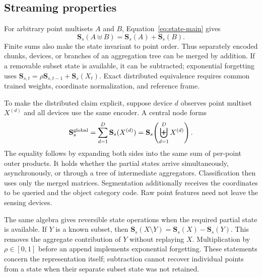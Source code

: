 \documentclass[times,twocolumn,final,authoryear]{elsarticle}
\newcommand{\Sstate}{\mathbf{S}}
\begin{document}
\subsection{Streaming properties}
For arbitrary point multisets $A$ and $B$, Equation~\eqref{eq:state-main} gives
\begin{equation}
\Sstate_s(A\uplus B)=\Sstate_s(A)+\Sstate_s(B).
\label{eq:add-main}
\end{equation}
Finite sums also make the state invariant to point order. Thus separately encoded chunks, devices, or branches of an aggregation tree can be merged by addition. If a removable subset state is available, it can be subtracted; exponential forgetting uses $\Sstate_{s,t}=\rho\Sstate_{s,t-1}+\Sstate_s(X_t)$. Exact distributed equivalence requires common trained weights, coordinate normalization, and reference frame.

To make the distributed claim explicit, suppose device $d$ observes point multiset $X^{(d)}$ and all devices use the same encoder. A central node forms
\begin{equation}
\Sstate_s^{\rm global}=\sum_{d=1}^{D}\Sstate_s(X^{(d)})
=\Sstate_s\!\left(\biguplus_{d=1}^{D}X^{(d)}\right).
\label{eq:distributed-main}
\end{equation}
The equality follows by expanding both sides into the same sum of per-point outer products. It holds whether the partial states arrive simultaneously, asynchronously, or through a tree of intermediate aggregators. Classification then uses only the merged matrices. Segmentation additionally receives the coordinates to be queried and the object category code. Raw point features need not leave the sensing devices.

The same algebra gives reversible state operations when the required partial state is available. If $Y$ is a known subset, then $\Sstate_s(X\setminus Y)=\Sstate_s(X)-\Sstate_s(Y)$. This removes the aggregate contribution of $Y$ without replaying $X$. Multiplication by $\rho\in[0,1]$ before an append implements exponential forgetting. These statements concern the representation itself; subtraction cannot recover individual points from a state when their separate subset state was not retained.
\end{document}
